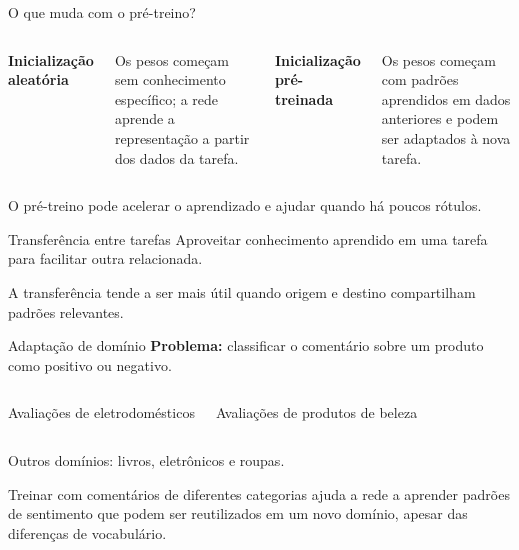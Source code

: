 \documentclass[aspectratio=169,11pt]{beamer}
\newcommand{\fonte}[1]{\par\smallskip{\footnotesize\color{Suave}#1}\par}
\newcommand{\painel}[2]{%
  \colorbox{Claro}{\parbox[c][19mm][c]{\dimexpr#1-2\fboxsep\relax}{\centering #2}}%
}
\newcommand{\comparar}[2]{%
  \begin{columns}[onlytextwidth,c]
    \column{.47\textwidth}\painel{\linewidth}{#1}
    \column{.47\textwidth}\painel{\linewidth}{#2}
  \end{columns}%
}
\begin{document}
\begin{frame}[t]{O que muda com o pré-treino?}
\smallskip
\begin{columns}[onlytextwidth,T]
  \painel{\linewidth}{\textbf{Inicialização aleatória}}
  \smallskip
  {\small Os pesos começam sem conhecimento específico; a rede aprende a representação a partir dos dados da tarefa.\par}
  \painel{\linewidth}{\textbf{Inicialização pré-treinada}}
  \smallskip
  {\small Os pesos começam com padrões aprendidos em dados anteriores e podem ser adaptados à nova tarefa.\par}
\end{columns}
\vfill
{\centering\small\color{Azul}O pré-treino pode acelerar o aprendizado e ajudar quando há poucos rótulos.\par}
\vfill\fonte{Seção 15.1}
\end{frame}

\begin{frame}[t]{Transferência entre tarefas}
\medskip
Aproveitar conhecimento aprendido em uma tarefa para facilitar outra relacionada.
\vfill
\centering
{}\par
\vfill
{\small\color{Suave}A transferência tende a ser mais útil quando origem e destino compartilham padrões relevantes.\par}
\end{frame}

\begin{frame}[t]{Adaptação de domínio}
\medskip
\textbf{Problema:} classificar o comentário sobre um produto como positivo ou negativo.
\vfill
\comparar{Avaliações de eletrodomésticos}{Avaliações de produtos de beleza}
\medskip
{\centering\small Outros domínios: livros, eletrônicos e roupas.\par}
\vfill
Treinar com comentários de diferentes categorias ajuda a rede a aprender padrões de sentimento que podem ser reutilizados em um novo domínio, apesar das diferenças de vocabulário.
\end{frame}
\end{document}
